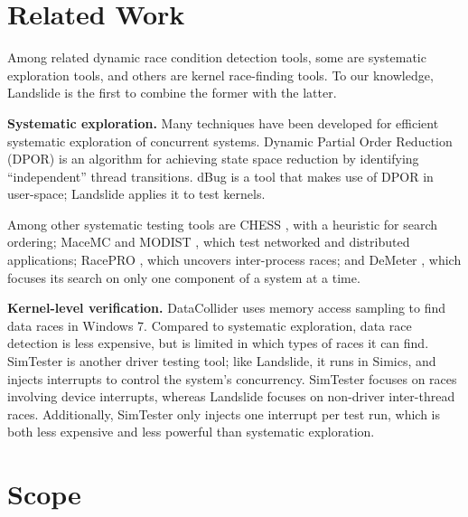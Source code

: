 \documentclass{llncs}
\begin{document}
\section{Related Work}

Among related dynamic race condition detection tools, some are systematic exploration tools, and others are kernel race-finding tools. To our knowledge, Landslide is the first to combine the former with the latter.

{\bf Systematic exploration.} Many techniques have been developed for efficient systematic exploration of concurrent systems. Dynamic Partial Order Reduction (DPOR) \cite{dpor} is an algorithm for achieving state space reduction by identifying ``independent'' thread transitions. dBug \cite{dbug-ssv} is a tool that makes use of DPOR in user-space; Landslide applies it to test kernels.

Among other systematic testing tools are CHESS \cite{chess}, with a heuristic for search ordering; MaceMC \cite{macemc} and MODIST \cite{modist}, which test networked and distributed applications; RacePRO \cite{racepro}, which uncovers inter-process races; and DeMeter \cite{demeter}, which focuses its search on only one component of a system at a time.

{\bf Kernel-level verification.}
DataCollider \cite{datacollider} uses memory access sampling to find data races in Windows 7. Compared to systematic exploration, data race detection is less expensive, but is limited in which types of races it can find.
SimTester \cite{simtester} is another driver testing tool; like Landslide, it runs in Simics, and injects interrupts to control the system's concurrency. SimTester focuses on races involving device interrupts, whereas Landslide focuses on non-driver inter-thread races. Additionally, SimTester only injects one interrupt per test run, which is both less expensive and less powerful than systematic exploration.

\section{Scope}
\end{document}
